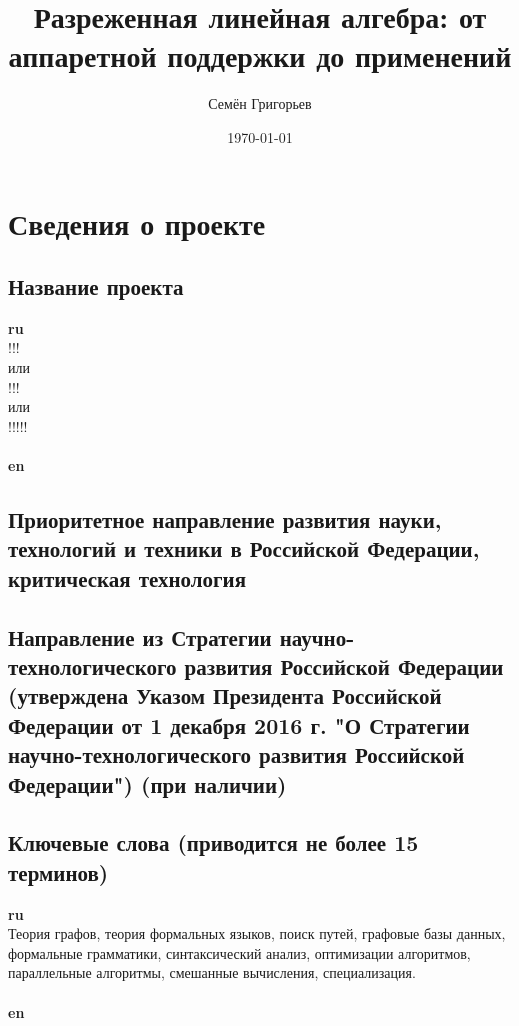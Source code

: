 \documentclass[12pt]{article}  %
\title{Разреженная линейная алгебра: от аппаретной поддержки до применений}
\author{Семён Григорьев}
\date{\today}
\theoremstyle{remark}
\begin{document}

\maketitle

\section{Сведения о проекте}

\subsection{Название проекта}

\textbf{ru}\\
%
!!!
\\
или
\\
!!!
\\
или
\\
!!!!!
\\
\\
\textbf{en}\\


\subsection{Приоритетное направление развития науки, технологий и техники в Российской Федерации, критическая технология}
%


\subsection{Направление из Стратегии научно-технологического развития Российской Федерации (утверждена Указом Президента Российской Федерации от 1 декабря 2016 г.  "О Стратегии научно-технологического развития Российской Федерации") (при наличии)}
%

\subsection{Ключевые слова (приводится не более 15 терминов)}

\textbf{ru}\\
%
Теория графов, теория формальных языков, поиск путей, графовые базы данных, формальные грамматики, синтаксический анализ, оптимизации алгоритмов, параллельные алгоритмы, смешанные вычисления, специализация.
\\
\\
\textbf{en}\\
\end{document}
